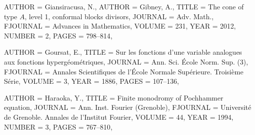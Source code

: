 \begin{bibdiv}
\begin{biblist}
 {
    AUTHOR = {Giansiracusa, N.},
    AUTHOR = {Gibney, A.},
     TITLE = {The cone of type {$A$}, level 1, conformal blocks divisors},
   JOURNAL = {Adv. Math.},
  FJOURNAL = {Advances in Mathematics},
    VOLUME = {231},
      YEAR = {2012},
    NUMBER = {2},
     PAGES = {798--814},
}




 {
    AUTHOR = {Goursat, E.},
     TITLE = {Sur les fonctions d'une variable analogues aux fonctions
              hyperg\'{e}om\'{e}triques},
   JOURNAL = {Ann. Sci. \'{E}cole Norm. Sup. (3)},
  FJOURNAL = {Annales Scientifiques de l'\'{E}cole Normale Sup\'{e}rieure. Troisi\`eme
              S\'{e}rie},
    VOLUME = {3},
      YEAR = {1886},
     PAGES = {107--136},
}





 {
    AUTHOR = {Haraoka, Y.},
     TITLE = {Finite monodromy of {P}ochhammer equation},
   JOURNAL = {Ann. Inst. Fourier (Grenoble)},
  FJOURNAL = {Universit\'{e} de Grenoble. Annales de l'Institut Fourier},
    VOLUME = {44},
      YEAR = {1994},
    NUMBER = {3},
     PAGES = {767--810},
}

\end{biblist}
\end{bibdiv}
